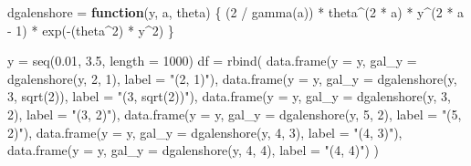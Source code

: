 \documentclass[
  11pt,
]{article}
\newenvironment{Shaded}{\begin{snugshade}}{\end{snugshade}}
\newcommand{\AttributeTok}[1]{\textcolor[rgb]{0.77,0.63,0.00}{#1}}
\newcommand{\ControlFlowTok}[1]{\textcolor[rgb]{0.13,0.29,0.53}{\textbf{#1}}}
\newcommand{\DecValTok}[1]{\textcolor[rgb]{0.00,0.00,0.81}{#1}}
\newcommand{\FloatTok}[1]{\textcolor[rgb]{0.00,0.00,0.81}{#1}}
\newcommand{\FunctionTok}[1]{\textcolor[rgb]{0.00,0.00,0.00}{#1}}
\newcommand{\NormalTok}[1]{#1}
\newcommand{\OtherTok}[1]{\textcolor[rgb]{0.56,0.35,0.01}{#1}}
\newcommand{\SpecialCharTok}[1]{\textcolor[rgb]{0.00,0.00,0.00}{#1}}
\newcommand{\StringTok}[1]{\textcolor[rgb]{0.31,0.60,0.02}{#1}}
\begin{document}
\begin{Shaded}
\begin{Highlighting}[]
\NormalTok{dgalenshore }\OtherTok{=} \ControlFlowTok{function}\NormalTok{(y, a, theta) \{}
\NormalTok{    (}\DecValTok{2} \SpecialCharTok{/} \FunctionTok{gamma}\NormalTok{(a)) }\SpecialCharTok{*}\NormalTok{ theta}\SpecialCharTok{\^{}}\NormalTok{(}\DecValTok{2} \SpecialCharTok{*}\NormalTok{ a) }\SpecialCharTok{*}\NormalTok{ y}\SpecialCharTok{\^{}}\NormalTok{(}\DecValTok{2} \SpecialCharTok{*}\NormalTok{ a }\SpecialCharTok{{-}} \DecValTok{1}\NormalTok{) }\SpecialCharTok{*} \FunctionTok{exp}\NormalTok{(}\SpecialCharTok{{-}}\NormalTok{(theta}\SpecialCharTok{\^{}}\DecValTok{2}\NormalTok{) }\SpecialCharTok{*}\NormalTok{ y}\SpecialCharTok{\^{}}\DecValTok{2}\NormalTok{)}
\NormalTok{\}}

\NormalTok{y }\OtherTok{=} \FunctionTok{seq}\NormalTok{(}\FloatTok{0.01}\NormalTok{, }\FloatTok{3.5}\NormalTok{, }\AttributeTok{length =} \DecValTok{1000}\NormalTok{)}
\NormalTok{df }\OtherTok{=} \FunctionTok{rbind}\NormalTok{(}
    \FunctionTok{data.frame}\NormalTok{(}\AttributeTok{y =}\NormalTok{ y, }\AttributeTok{gal\_y =} \FunctionTok{dgalenshore}\NormalTok{(y, }\DecValTok{2}\NormalTok{, }\DecValTok{1}\NormalTok{), }\AttributeTok{label =} \StringTok{"(2, 1)"}\NormalTok{),}
    \FunctionTok{data.frame}\NormalTok{(}\AttributeTok{y =}\NormalTok{ y, }\AttributeTok{gal\_y =} \FunctionTok{dgalenshore}\NormalTok{(y, }\DecValTok{3}\NormalTok{, }\FunctionTok{sqrt}\NormalTok{(}\DecValTok{2}\NormalTok{)), }\AttributeTok{label =} \StringTok{"(3, sqrt(2))"}\NormalTok{),}
    \FunctionTok{data.frame}\NormalTok{(}\AttributeTok{y =}\NormalTok{ y, }\AttributeTok{gal\_y =} \FunctionTok{dgalenshore}\NormalTok{(y, }\DecValTok{3}\NormalTok{, }\DecValTok{2}\NormalTok{), }\AttributeTok{label =} \StringTok{"(3, 2)"}\NormalTok{),}
    \FunctionTok{data.frame}\NormalTok{(}\AttributeTok{y =}\NormalTok{ y, }\AttributeTok{gal\_y =} \FunctionTok{dgalenshore}\NormalTok{(y, }\DecValTok{5}\NormalTok{, }\DecValTok{2}\NormalTok{), }\AttributeTok{label =} \StringTok{"(5, 2)"}\NormalTok{),}
    \FunctionTok{data.frame}\NormalTok{(}\AttributeTok{y =}\NormalTok{ y, }\AttributeTok{gal\_y =} \FunctionTok{dgalenshore}\NormalTok{(y, }\DecValTok{4}\NormalTok{, }\DecValTok{3}\NormalTok{), }\AttributeTok{label =} \StringTok{"(4, 3)"}\NormalTok{),}
    \FunctionTok{data.frame}\NormalTok{(}\AttributeTok{y =}\NormalTok{ y, }\AttributeTok{gal\_y =} \FunctionTok{dgalenshore}\NormalTok{(y, }\DecValTok{4}\NormalTok{, }\DecValTok{4}\NormalTok{), }\AttributeTok{label =} \StringTok{"(4, 4)"}\NormalTok{)}
\NormalTok{)}
\end{Highlighting}
\end{Shaded}
\end{document}
